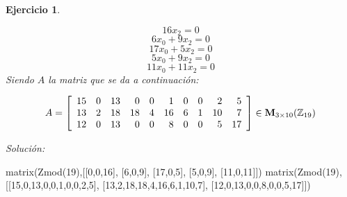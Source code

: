 \documentclass[12pt]{amsart}
\newtheorem{ejer}{Ejercicio}
\begin{document}
\begin{ejer}
\begin{minipage}{\textwidth}
\begin{tcolorbox}[colback = red!20!white,title=Versión Ecuaciones Implícitas]
\[ 16 x_{2} = 0 \]
\[ 6 x_{0} + 9 x_{2} = 0 \]
\[ 17 x_{0} + 5 x_{2} = 0 \]
\[ 5 x_{0} + 9 x_{2} = 0 \]
\[ 11 x_{0} + 11 x_{2} = 0 \]
Siendo $A$ la matriz que se da a continuación:
\end{tcolorbox}
\end{minipage}
\[ A = \left[\begin{array}{rrrrrrrrrr}
15 & 0 & 13 & 0 & 0 & 1 & 0 & 0 & 2 & 5 \\
13 & 2 & 18 & 18 & 4 & 16 & 6 & 1 & 10 & 7 \\
12 & 0 & 13 & 0 & 0 & 8 & 0 & 0 & 5 & 17
\end{array}\right] \in {\bf M}_{3\times 10}({\mathbb Z}_{19})\]
\end{ejer}

{\it Soluci\'on:}

\begin{sageblock}
matrix(Zmod(19),[[0,0,16],
[6,0,9],
[17,0,5],
[5,0,9],
[11,0,11]])
matrix(Zmod(19),[[15,0,13,0,0,1,0,0,2,5],
[13,2,18,18,4,16,6,1,10,7],
[12,0,13,0,0,8,0,0,5,17]])
\end{sageblock}

\end{document}
